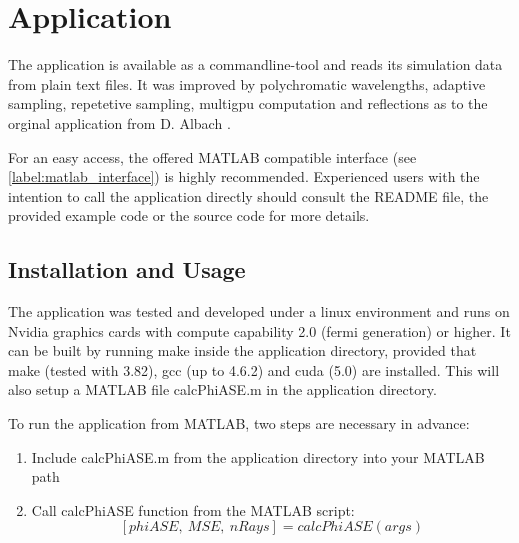 \section{Application}
\label{sec:application}

The application is available as a commandline-tool and reads
its simulation data from plain text files. It was improved by polychromatic
wavelengths, adaptive sampling, repetetive sampling, multigpu computation and 
reflections as to the orginal application from D. Albach \cite{ASE2010}.

For an easy access, the offered MATLAB compatible interface (see \ref{label:matlab_interface}) 
is highly recommended. Experienced users with the intention to call the application
directly should consult the README file, the provided 
example code or the source code for more details.

\subsection{Installation and Usage}
The application was tested and developed under a linux environment
and runs on Nvidia graphics cards with compute capability 2.0 (fermi generation) or higher.
It can be built by running make inside the application directory, provided
that make (tested with 3.82), gcc (up to 4.6.2) and cuda (5.0) are installed. 
This will also setup a MATLAB file calcPhiASE.m in the application
directory. 

To run the application from MATLAB, two steps are
necessary in advance:
\begin{enumerate}
  \label{label:matlab_interface}
  \item Include calcPhiASE.m from the application directory into your MATLAB path
  \item Call calcPhiASE function from the MATLAB script: \[[phiASE,~MSE,~nRays] = calcPhiASE(args)\]
\end{enumerate}

